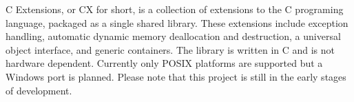 C Extensions, or CX for short, is a collection of extensions to the C programing language, packaged as a single shared library. These extensions include exception handling, automatic dynamic memory deallocation and destruction, a universal object interface, and generic containers. The library is written in C and is not hardware dependent. Currently only P\+O\+S\+IX platforms are supported but a Windows port is planned. Please note that this project is still in the early stages of development. 